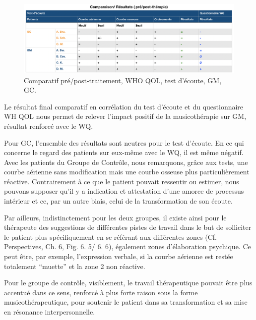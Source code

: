 \begin{figure}
\centering
\includegraphics[width=\linewidth]{images/graphiques/comparaison_pre_post.png}
\caption[Corrélation résultats pré/post]{Comparatif
  pré/post-traitement, WHO QOL, test d'écoute, GM, GC.}

\label{comparaison_pre_post}
\end{figure}


Le résultat final comparatif en corrélation du test d'écoute et du questionnaire WH QOL nous permet
                de relever l'impact positif de la
                musicothérapie sur GM, résultat renforcé
                avec le WQ.


                Pour GC, l'ensemble des résultats sont neutres pour le
                test d'écoute. En ce qui concerne le
                regard des patients sur eux-même avec le WQ, il est
                même négatif. Avec les patients du Groupe de
              Contrôle, nous remarquons, grâce aux tests, une courbe aérienne
              sans modification mais une courbe osseuse plus
              particulièrement réactive. Contrairement à
              ce que le patient pouvait ressentir ou estimer, nous pouvons supposer qu'il y a indication  et attestation d'une amorce de
              processus intérieur et ce, par un autre biais, celui de
              la transformation de son
              écoute.

 Par ailleurs, indistinctement pour les deux
 groupes, il existe ainsi pour le thérapeute des
 suggestions de différentes pistes de travail dans le but de
 solliciter le patient plus spécifiquement en se référant aux
              différentes zones (Cf. Perspectives, Ch. 6, Fig. 6. 5/ 6. 6), également zones
 d'élaboration psychique. Ce peut être, par exemple,
              l'expression verbale, si la courbe aérienne est restée
              totalement ``muette'' et la zone 2 non
              réactive.

              Pour le groupe de contrôle, visiblement, le travail
                thérapeutique pouvait être plus accentué dans ce
                sens, renforcé à plus forte raison sous la forme musicothérapeutique, pour soutenir le
                patient dans sa transformation et sa mise en résonance
                interpersonnelle.



